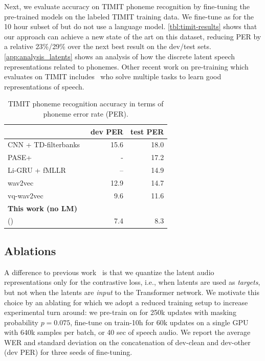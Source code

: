 \documentclass{article}
\begin{document}
Next, we evaluate accuracy on TIMIT phoneme recognition by fine-tuning the pre-trained models on the labeled TIMIT training data. 
We fine-tune as for the 10 hour subset of \libril{} but do not use a language model.
\autoref{tbl:timit-results} shows that our approach can achieve a new state of the art on this dataset, reducing PER by a relative 23\%/29\% over the next best result on the dev/test sets.
\autoref{app:analysis_latents} shows an analysis of how the discrete latent speech representations related to phonemes.
Other recent work on pre-training which evaluates on TIMIT includes~\citep{ravanelli2020pasep} who solve multiple tasks to learn good representations of speech.

\begin{table}
\caption{%
TIMIT phoneme recognition accuracy in terms of phoneme error rate (PER).
}
\label{tbl:timit-results}
\centering
\begin{tabular}{lrr}
\toprule
{} &   dev PER &  test PER \\
\midrule
CNN + TD-filterbanks~\citep{zeghidour2018filters} & 15.6 & 18.0 \\
PASE+~\citep{ravanelli2020pasep} & - & 17.2 \\
Li-GRU + fMLLR~\citep{ravanelli2018light} & -- & 14.9 \\ %
wav2vec~\citep{schneider2019wav2vec} & {12.9} & {14.7}  \\
vq-wav2vec~\citep{baevski2019vqwav2vec} & 9.6 & 11.6 \\
\midrule
\textbf{This work (no LM)} \\ 
\wvppbig{} (\librisz{}) & 7.4 & 8.3 \\
\bottomrule
\end{tabular}
\end{table}

\subsection{Ablations}
\label{sec:ablations}

A difference to previous work~\cite{baevski2019vqwav2vec,baevski2019effectiveness} is that we quantize the latent audio representations only for the contrastive loss, i.e., when latents are used as \emph{targets}, but not when the latents are \emph{input} to the Transformer network. 
We motivate this choice by an ablating for which we adopt a reduced training setup to increase experimental turn around: 
we pre-train \wvppbase{} on \librisz{} for 250k updates with masking probability $p=0.075$, fine-tune on train-10h for 60k updates on a single GPU with 640k samples per batch, or 40 sec of speech audio.
We report the average WER and standard deviation on the concatenation of dev-clean and dev-other (dev PER) for three seeds of fine-tuning.
\end{document}
